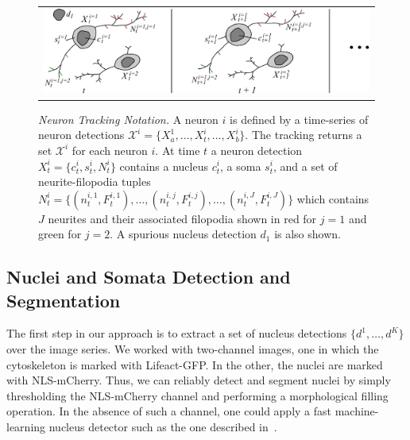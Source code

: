 \begin{figure}[t]
  \begin{center}
       \begin{tabular}{c}
        \includegraphics[width = 110mm] {images/neurondrawing.pdf}\\ [-2.4ex]
       \end{tabular} 
    \caption{  {\footnotesize  {\it Neuron  Tracking  Notation.  }   A
        neuron $i$  is defined by  a time-series of  neuron detections
        $\mathcal{X}^i     =     \{X_{a}^1,\ldots,X_t^i,\ldots,X_{b}^i
        \}$.  The  tracking returns  a  set  $\mathcal{X}^i$ for  each
        neuron $i$.  At time $t$ a neuron detection $X_t^i = \{ c_t^i,
        s_t^i, N_t^i  \}$ contains a nucleus $c_t^i$,  a soma $s_t^i$,
        and    a  set of   neurite-filopodia    tuples    $N_t^i     =    \{(
        n_t^{i,1},F_t^{i,1}),   \ldots,(n_t^{i,j},F_t^{i,j}),  \ldots,
        (n_t^{i,J},F_t^{i,J})  \}$  which  contains $J$  neurites  and
        their associated  filopodia shown in  red for $j=1$  and green
        for  $j=2$. A spurious nucleus  detection  $d_1$ is also shown.}}
    \label{fig:notation}
  \end{center}
\vspace{-9mm}
\end{figure}

\subsection{Nuclei and Somata Detection and Segmentation}
\label{sec:detection}
\vspace{-2mm}
The  first  step in  our  approach  is to  extract  a  set of  nucleus
detections $\{d^1,\ldots,d^K\}$ over the  image series. We worked with
two-channel  images, one  in  which the  cytoskeleton  is marked  with
Lifeact-GFP.    In   the   other,   the   nuclei   are   marked   with
NLS-mCherry. Thus, we can reliably detect and segment nuclei by simply
thresholding  the NLS-mCherry channel  and performing  a morphological
filling operation.  In the absence  of such a channel, one could apply
a  fast machine-learning nucleus  detector such  as the  one described
in~\cite{Smith09}.


